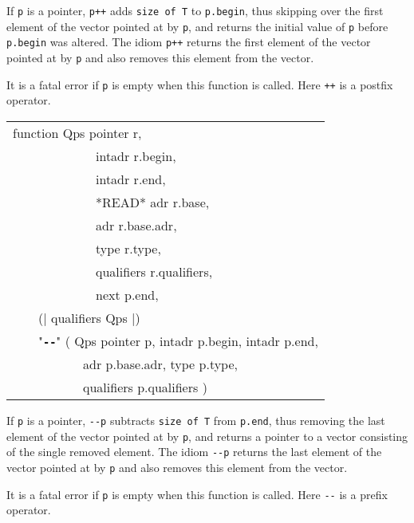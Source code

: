 \documentclass[12pt]{article}
\makeatletter
\newcommand{\TT}[1]{{\tt \bfseries #1}}
\newcommand{\ttmkey}[2]{\TT{#1}\index{#1@{\tt #1}!#2}}
\newenvironment{indpar}[1][0.3in]%
	{\begin{list}{}%
		     {\setlength{\itemsep}{0in}%
		      \setlength{\topsep}{0in}%
		      \setlength{\parsep}{1ex}%
		      \setlength{\labelwidth}{#1}%
		      \setlength{\leftmargin}{#1}%
		      \addtolength{\leftmargin}{\labelsep}}%
	 \item}%
	{\end{list}}
\makeatother
\begin{document}
\begin{indpar}
\begin{indpar}
If {\tt p} is a pointer, {\tt p++} adds {\tt size of T} to {\tt p.begin},
thus skipping over the first element of the vector pointed at by {\tt p},
and returns the initial value of {\tt p} before {\tt p.begin} was
altered.  The idiom {\tt *p++} returns the first element of the vector
pointed at by {\tt p} and also removes this element from the vector.

It is a fatal error if {\tt p} is empty when this function is
called.  Here {\tt ++} is a postfix operator.
\end{indpar}

{\tt\begin{tabular}{@{}l}
function Qps pointer r, \\
~~~~~~~~~~~~~intadr r.begin, \\
~~~~~~~~~~~~~intadr r.end, \\
~~~~~~~~~~~~~*READ* adr r.base, \\
~~~~~~~~~~~~~adr r.base.adr, \\
~~~~~~~~~~~~~type r.type, \\
~~~~~~~~~~~~~qualifiers r.qualifiers, \\
~~~~~~~~~~~~~next p.end, \\
~~~~(| qualifiers Qps |) \\
~~~~"\ttmkey{-{}-}{of pointer}"
         ( Qps pointer p, intadr p.begin, intadr p.end, \\
~~~~~~~~~~~adr p.base.adr, type p.type, \\
~~~~~~~~~~~qualifiers p.qualifiers ) \\
\end{tabular}}

\begin{indpar}
If {\tt p} is a pointer, {\tt -{}-p} subtracts {\tt size of T} from {\tt p.end},
thus removing the last element of the vector pointed at by {\tt p},
and returns a pointer to a vector consisting of the single removed element.
The idiom {\tt *-{}-p} returns the last element of the vector
pointed at by {\tt p} and also removes this element from the vector.

It is a fatal error if {\tt p} is empty when this function is
called.  Here {\tt -{}-} is a prefix operator.
\end{indpar}


\end{indpar}
\end{document}
